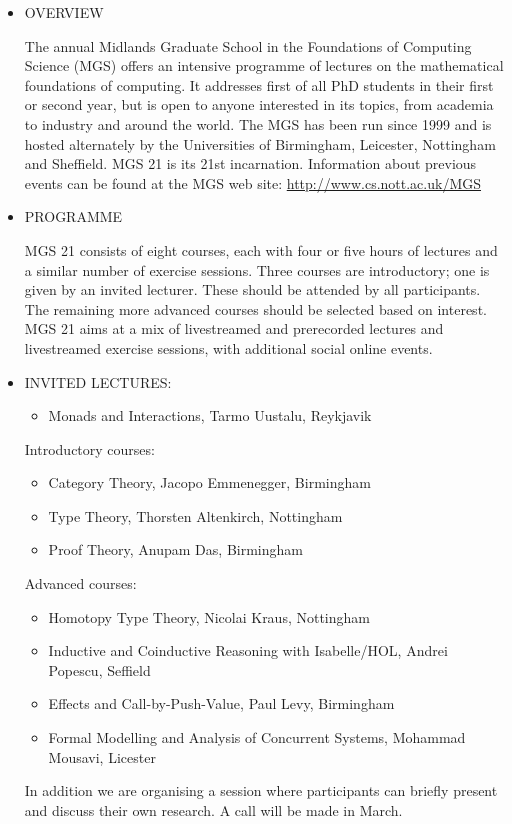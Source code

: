 \documentclass[prodmode,acmtecs]{acmsmall} %
\begin{document}
\begin{itemize}\item  OVERVIEW  
 
  The annual Midlands Graduate School in the Foundations of Computing Science (MGS) offers an intensive programme of lectures on the mathematical foundations of computing. It addresses first of all PhD students in their first or second year, but is open to anyone interested in its topics, from academia to industry and around the world. The MGS has been run since 1999 and is hosted alternately by the Universities of Birmingham, Leicester, Nottingham and Sheffield. MGS 21 is its 21st incarnation. Information about previous events can be found at the MGS web site: \href{http://www.cs.nott.ac.uk/MGS}{http://www.cs.nott.ac.uk/MGS} 
 
\item  PROGRAMME  
 
  MGS 21 consists of eight courses, each with four or five hours of lectures and a similar number of exercise sessions. Three courses are introductory; one is given by an invited lecturer. These should be attended by all participants. The remaining more advanced courses should be selected based on interest. MGS 21 aims at a mix of livestreamed and prerecorded lectures and livestreamed exercise sessions, with additional social online events. 
 
\item  INVITED LECTURES:  
 
\begin{itemize}\item  Monads and Interactions, Tarmo Uustalu, Reykjavik
\end{itemize} 
  Introductory courses: 
 
\begin{itemize}\item  Category Theory, Jacopo Emmenegger, Birmingham
\item  Type Theory, Thorsten Altenkirch, Nottingham
\item  Proof Theory, Anupam Das, Birmingham
\end{itemize} 
  Advanced courses: 
 
\begin{itemize}\item  Homotopy Type Theory, Nicolai Kraus, Nottingham
\item  Inductive and Coinductive Reasoning with Isabelle/HOL, Andrei Popescu, Seffield
\item  Effects and Call-by-Push-Value, Paul Levy, Birmingham
\item  Formal Modelling and Analysis of Concurrent Systems, Mohammad Mousavi, Licester
\end{itemize} 
  In addition we are organising a session where participants can briefly present and discuss their own research. A call will be made in March. 
 

\end{itemize}
\end{document}
